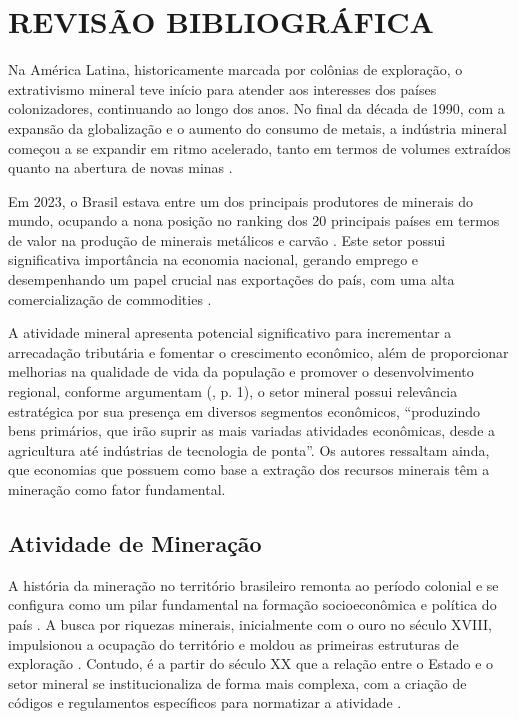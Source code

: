 \chapter{REVISÃO BIBLIOGRÁFICA}
\label{cap1Revisao}

Na América Latina, historicamente marcada por colônias de exploração, o extrativismo mineral teve início para atender aos interesses dos países colonizadores, continuando ao longo dos anos. No final da década de 1990, com a expansão da globalização e o aumento do consumo de metais, a indústria mineral começou a se expandir em ritmo acelerado, tanto em termos de volumes extraídos quanto na abertura de novas minas \cite{fernandes2016mineracao}.

Em 2023, o Brasil estava entre um dos principais produtores de minerais do mundo, ocupando a nona posição no ranking dos 20 principais países em termos de valor na produção de minerais metálicos e carvão \cite{wpr2024mineral}. Este setor possui significativa importância na economia nacional, gerando emprego e desempenhando um papel crucial nas exportações do país, com uma alta comercialização de commodities \cite{rbm2024mineracao}.

A atividade mineral apresenta potencial significativo para incrementar a arrecadação tributária e fomentar o crescimento econômico, além de proporcionar melhorias na qualidade de vida da população e promover o desenvolvimento regional, conforme argumentam \citeauthor{carvalho2012dependencia} (\citeyear{carvalho2012dependencia}, p. 1), o setor mineral possui relevância estratégica por sua presença em diversos segmentos econômicos, ``produzindo bens primários, que irão suprir as mais variadas atividades econômicas, desde a agricultura até indústrias de tecnologia de ponta''. Os autores ressaltam ainda, que
economias que possuem como base a extração dos recursos minerais têm a mineração como fator fundamental.

\section{Atividade de Mineração}
\label{sec:atividade_mineracao}

A história da mineração no território brasileiro remonta ao período colonial e se configura como um pilar fundamental na formação socioeconômica e política do país \cite{barreto2001, domingues2022}. A busca por riquezas minerais, inicialmente com o ouro no século XVIII, impulsionou a ocupação do território e moldou as primeiras estruturas de exploração \cite{barreto2001}. Contudo, é a partir do século XX que a relação entre o Estado e o setor mineral se institucionaliza de forma mais complexa, com a criação de códigos e regulamentos específicos para normatizar a atividade \cite{domingues2022}.

